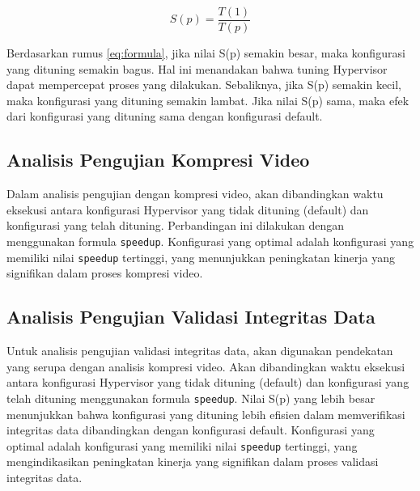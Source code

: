 \begin{equation}
    S(p) = \frac{T(1)}{T(p)}
    \label{eq:formula}
\end{equation}

Berdasarkan rumus \ref{eq:formula}, jika nilai S(p) semakin besar, maka konfigurasi yang dituning semakin bagus. Hal ini menandakan bahwa tuning Hypervisor dapat mempercepat proses yang dilakukan. Sebaliknya, jika S(p) semakin kecil, maka konfigurasi yang dituning semakin lambat. Jika nilai S(p) sama, maka efek dari konfigurasi yang dituning sama dengan konfigurasi default.

\subsection{Analisis Pengujian Kompresi Video}
Dalam analisis pengujian dengan kompresi video, akan dibandingkan waktu eksekusi antara konfigurasi Hypervisor yang tidak dituning (default) dan konfigurasi yang telah dituning. Perbandingan ini dilakukan dengan menggunakan formula \texttt{speedup}. Konfigurasi yang optimal adalah konfigurasi yang memiliki nilai \texttt{speedup} tertinggi, yang menunjukkan peningkatan kinerja yang signifikan dalam proses kompresi video.

\subsection{Analisis Pengujian Validasi Integritas Data}
Untuk analisis pengujian validasi integritas data, akan digunakan pendekatan yang serupa dengan analisis kompresi video. Akan dibandingkan waktu eksekusi antara konfigurasi Hypervisor yang tidak dituning (default) dan konfigurasi yang telah dituning menggunakan formula \texttt{speedup}. Nilai S(p) yang lebih besar menunjukkan bahwa konfigurasi yang dituning lebih efisien dalam memverifikasi integritas data dibandingkan dengan konfigurasi default. Konfigurasi yang optimal adalah konfigurasi yang memiliki nilai \texttt{speedup} tertinggi, yang mengindikasikan peningkatan kinerja yang signifikan dalam proses validasi integritas data.

